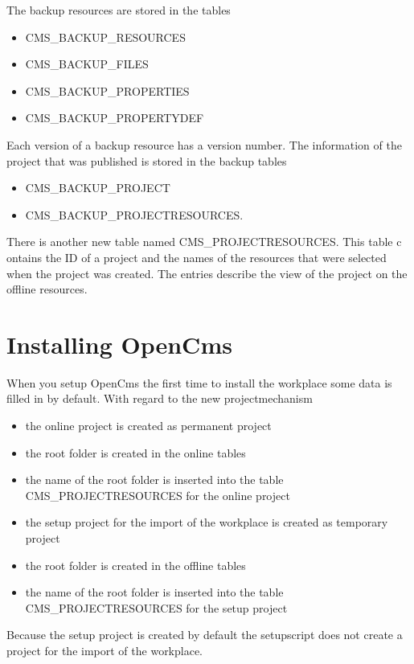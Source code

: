 The backup resources are stored in the tables
\begin{itemize}
\item CMS\_BACKUP\_RESOURCES
\item CMS\_BACKUP\_FILES
\item CMS\_BACKUP\_PROPERTIES
\item CMS\_BACKUP\_PROPERTYDEF
\end{itemize}
Each version of a backup resource has a version number. The
information of the project that was published is stored in the
backup tables

\begin{itemize}
\item CMS\_BACKUP\_PROJECT
\item CMS\_BACKUP\_PROJECTRESOURCES.
\end{itemize}

There is another new table named CMS\_PROJECTRESOURCES. This table
c ontains the ID of a project and the names of the resources that
were selected when the project was created. The entries describe
the view of the project on the offline resources.

\section{Installing OpenCms}

When you setup OpenCms the first time to install the workplace
some data is filled in by default. With regard to the new
projectmechanism

\begin{itemize}
\item the online project is created as permanent project
\item the root folder is created in the online tables
\item the name of the root folder is inserted into the table CMS\_PROJECTRESOURCES for the online project
\item the setup project for the import of the workplace is created as temporary project
\item the root folder is created in the offline tables
\item the name of the root folder is inserted into the table CMS\_PROJECTRESOURCES for the setup project
\end{itemize}

Because the setup project is created by default the setupscript
does not create a project for the import of the workplace.

